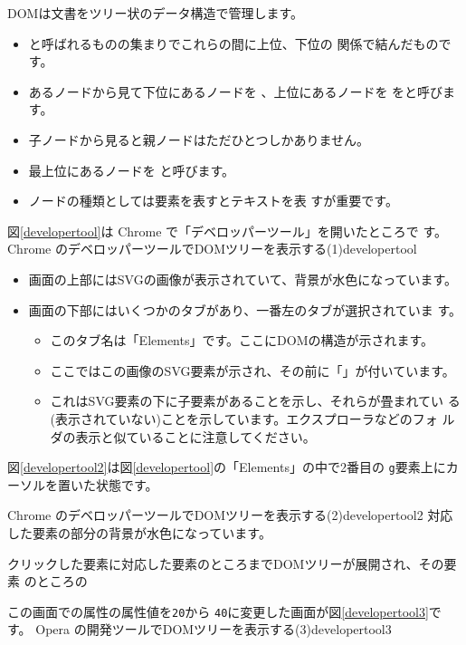 DOMは文書をツリー状のデータ構造で管理します。
\begin{itemize}
 \item {}と呼ばれるものの集まりでこれらの間に上位、下位の
       関係で結んだものです。
 \item あるノードから見て下位にあるノードを
        、上位にあるノードを
       をと呼びます。
 \item 子ノードから見ると親ノードはただひとつしかありません。
 \item 最上位にあるノードを
       と呼びます。
 \item ノードの種類としては要素を表すとテキストを表
       すが重要です。
\end{itemize}
図\ref{developertool}は Chrome で「デベロッパーツール」を開いたところで
す。
{Chrome のデベロッパーツールでDOMツリーを表示する(1)}{developertool}
\begin{itemize}
 \item 画面の上部にはSVGの画像が表示されていて、背景が水色になっています。
 \item 画面の下部にはいくつかのタブがあり、一番左のタブが選択されていま
			 す。
 \begin{itemize}
	\item このタブ名は「Elements」です。ここにDOMの構造が示されます。
	\item ここではこの画像のSVG要素が示され、その前に「」が付いています。
	\item これはSVG要素の下に子要素があることを示し、それらが畳まれてい
				る(表示されていない)ことを示しています。エクスプローラなどのフォ
				ルダの表示と似ていることに注意してください。
 \end{itemize}
\end{itemize}
図\ref{developertool2}は図\ref{developertool}の「Elements」の中で2番目の
\texttt{g}要素上にカーソルを置いた状態です。

{Chrome のデベロッパーツールでDOMツリーを表示する(2)}{developertool2}
対応した要素の部分の背景が水色になっています。

クリックした要素に対応した要素のところまでDOMツリーが展開され、その要素
のところの

この画面での属性の属性値を\texttt{20}から
\texttt{40}に変更した画面が図\ref{developertool3}です。
{Opera の開発ツールでDOMツリーを表示する(3)}{developertool3}

